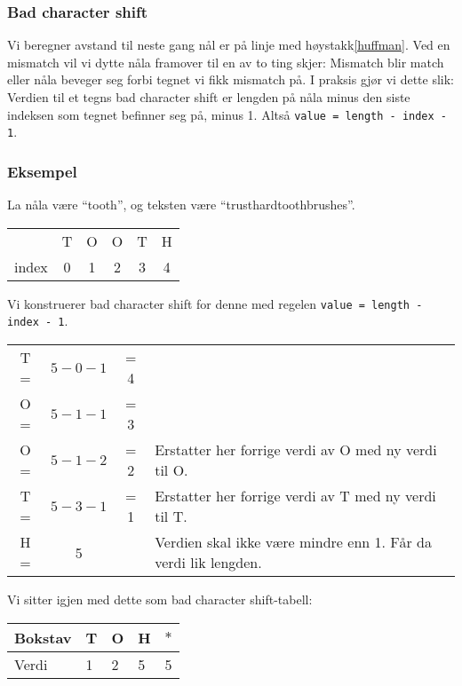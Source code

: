 	\subsubsection{Bad character shift}
		Vi beregner avstand til neste gang nål er på linje med høystakk\ref{huffman}.
		Ved en mismatch vil vi dytte nåla framover til en av to ting skjer: Mismatch blir match eller nåla beveger seg forbi tegnet vi fikk mismatch på.
		I praksis gjør vi dette slik: Verdien til et tegns bad character shift er lengden på nåla minus den siste indeksen som tegnet befinner seg på, minus 1. Altså \verb|value = length - index - 1|.
		
		\subsubsection*{Eksempel}
		La nåla være ``tooth'', og teksten være ``trusthardtoothbrushes''.
		
		\begin{center}
			\begin{tabular}{c c c c c c}
				& T & O & O & T & H \\
				index & 0 & 1 & 2 & 3 & 4
			\end{tabular}
		\end{center}

		Vi konstruerer bad character shift for denne med regelen \verb|value = length - index - 1|.

\begin{center}
\begin{tabular}{cccl}
T = & $5-0-1$&= 4\\
O = & $5-1-1$&= 3\\
O = & $5-1-2$&= 2&Erstatter her forrige verdi av O med ny verdi til O.\\
T = &$5-3-1$& = 1&Erstatter her forrige verdi av T med ny verdi til T.\\
H = &5 &&Verdien skal ikke være mindre enn 1. Får da verdi lik lengden.\\
\end{tabular}

Vi sitter igjen med dette som bad character shift-tabell: \newline
\begin{tabular}{l|llll}
Bokstav&T&O&H&$*$\\
\hline
Verdi&1&2&5&5\\
\end{tabular}
\end{center}

